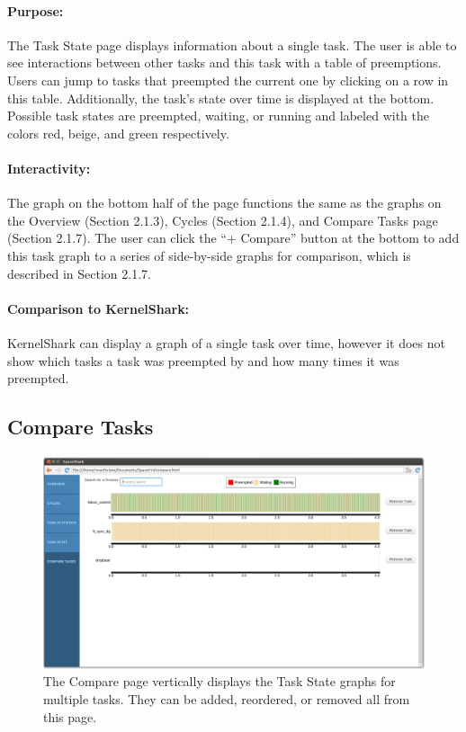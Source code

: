 \documentclass{hmcclinic}
\begin{document}
\paragraph{Purpose:}
    The Task State page displays information about a single task. The user is
    able to see interactions between other tasks and this task with a table of
    preemptions. Users can jump to tasks that preempted the current one by
    clicking on a row in this table. Additionally, the task's state over time
    is displayed at the bottom. Possible task states are preempted, waiting, or
    running and labeled with the colors red, beige, and green respectively. 

\paragraph{Interactivity:}
    The graph on the bottom half of the page functions the same as the graphs on
    the Overview (Section 2.1.3), Cycles (Section 2.1.4), and Compare Tasks page
    (Section 2.1.7). The user can click the ``+ Compare'' button at the bottom
    to add this task graph to a series of side-by-side graphs for comparison,
    which is described in Section 2.1.7.
    
\paragraph{Comparison to KernelShark:}
     KernelShark can display a graph of a single task over time, however it does not show which tasks a task was preempted by and how many times it was preempted.
  
  \subsection{Compare Tasks} %
  
  \begin{figure}[H]
  \includegraphics[scale=0.25]{compare-page.png}
  \caption{The Compare page vertically displays the Task State graphs for
  multiple tasks. They can be added, reordered, or removed all from this page.}
  \end{figure}
\end{document}
